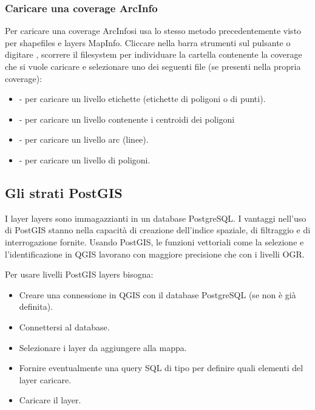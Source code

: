 \subsubsection{Caricare una coverage ArcInfo}

Per caricare una coverage ArcInfosi usa lo stesso metodo precedentemente visto
per shapefiles e layers MapInfo. 
Cliccare nella barra strumenti sul pulsante
 o digitare
, scorrere il filesystem per individuare la cartella contenente
la coverage che si vuole caricare e selezionare uno dei seguenti file (se
presenti nella propria coverage):

\begin{itemize}
\item {} - per caricare un livello etichette (etichette di poligoni o di punti).
\item {} - per caricare un livello contenente i centroidi dei poligoni 
\item {} - per caricare un livello arc (linee).
\item {} - per caricare un livello di poligoni.
\end{itemize}

\subsection{Gli strati PostGIS}
\label{label_postgis} 

I layer layers sono immagazzianti in un database PostgreSQL. I vantaggi
nell'uso di PostGIS stanno nella capacità di creazione dell'indice spaziale,
di filtraggio e di interrogazione fornite. Usando PostGIS, le funzioni
vettoriali come la selezione e l'identificazione in QGIS lavorano con maggiore
precisione che con i livelli OGR.

Per usare livelli PostGIS layers bisogna:

\begin{itemize}
\item Creare una connessione in QGIS con il database PostgreSQL (se non è già
definita).
\item Connettersi al database.
\item Selezionare i layer da aggiungere alla mappa.
\item Fornire eventualmente una query SQL di tipo  per
definire quali elementi del layer caricare.
\item Caricare il layer.
\end{itemize}

